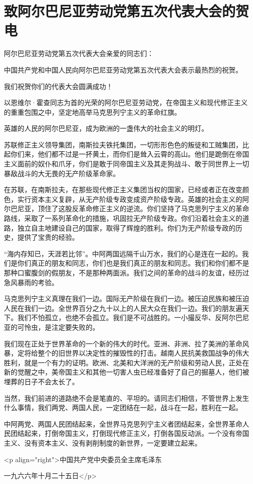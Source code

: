 \section[致阿尔巴尼亚劳动党第五次代表大会的贺电（一九六六年十月二十五日）]{致阿尔巴尼亚劳动党第五次代表大会的贺电}


阿尔巴尼亚劳动党第五次代表大会亲爱的同志们：

中国共产党和中国人民向阿尔巴尼亚劳动党第五次代表大会表示最热烈的祝贺。

我们祝贺你们的代表大会圆满成功！

以恩维尔·霍查同志为首的光荣的阿尔巴尼亚劳动党，在帝国主义和现代修正主义的重重包围之中，坚定地高举马克思列宁主义的革命红旗。

英雄的人民的阿尔巴尼亚，成为欧洲的一盏伟大的社会主义的明灯。

苏联修正主义领导集团，南斯拉夫铁托集团，一切形形色色的叛徒和工贼集团，比起你们来，他们都不过是一抔黄土，而你们是耸入云霄的高山。他们是跪倒在帝国主义面前的奴仆和爪牙，你们是敢于同帝国主义及其走狗战斗、敢于同世界上一切暴敌战斗的大无畏的无产阶级革命家。

在苏联，在南斯拉夫，在那些现代修正主义集团当权的国家，已经或者正在改变颜色，实行资本主义复辟，从无产阶级专政变成资产阶级专政。英雄的社会主义的阿尔巴尼亚，顶住了这股反革命修正主义的逆流。你们坚持了马克思列宁主义的革命路线，采取了一系列革命化的措施，巩固拉无产阶级专政。你们沿着社会主义的道路，独立自主地建设自己的国家，取得了辉煌的胜利。你们为无产阶级专政的历史，提供了宝贵的经验。

“海内存知已，天涯若比邻”。中阿两国远隔千山万水，我们的心是连在一起的。我们是你们真正的朋友和同志，你们也是我们真正的朋友和同志。我们和你们都不是那种口蜜腹剑的假朋友，不是那种两面派。我们之间的革命的战斗的友谊，经历过急风暴雨的考验。

马克思列宁主义真理在我们一边。国际无产阶级在我们一边。被压迫民族和被压迫人民在我们一边。全世界百分之九十以上的人民大众在我们一边。我们的朋友遍天下。我们不怕孤立，也绝不会孤立。我们是不可战胜的。一小撮反华、反阿尔巴尼亚的可怜虫，是注定要失败的。

我们现在正处于世界革命的一个新的伟大的时代。亚洲、非洲、拉了美洲的革命风暴，定将给整个的旧世界以决定性的摧毁性的打击。越南人民抗美救国战争的伟大胜利，就是一个有力的证明。欧洲、北美和大洋洲的无产阶级和劳动人民，正处在新的觉醒之中，美帝国主义和其他一切害人虫已经准备好了自己的掘墓人，他们被埋葬的日子不会太长了。

当然，我们前进的道路绝不会是笔直的、平坦的。请同志们相信，不管世界上发生什么事情，我们两党、两国人民，一定团结在一起，战斗在一起，胜利在一起。

中阿两党、两国人民团结起来，全世界马克思列宁主义者团结起来，全世界革命人民团结起来，打倒帝国主义，打倒现代修正主义，打倒各国反动派。一个没有帝国主义、没有资本主义、没有剥削制度的新世界，一定要建立起来。

<p align="right">中国共产党中央委员全主席毛泽东

一九六六年十月二十五日</p>


